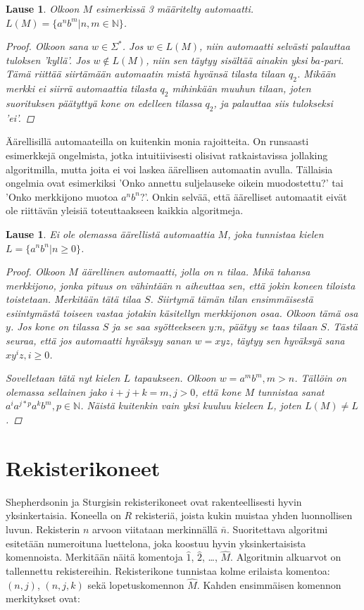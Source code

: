 \documentclass[a4paper, 12pt]{article}
\theoremstyle{definition}
\theoremstyle{plain}
\newtheorem{teor}[mydef]{Lause}
\begin{document}
\begin{teor}
Olkoon $M$ esimerkissä 3 määritelty automaatti. \\ $L(M) = \{a^nb^m | n, m \in \mathbb{N}\}$.
\begin{proof}
Olkoon sana $w \in \Sigma^*$. Jos $w \in L(M)$, niin automaatti selvästi palauttaa tuloksen 'kyllä'. Jos $w \notin L(M)$, niin sen täytyy sisältää ainakin yksi $ba$-pari. Tämä riittää siirtämään automaatin mistä hyvänsä tilasta tilaan $q_2$. Mikään merkki ei siirrä automaattia tilasta $q_2$ mihinkään muuhun tilaan, joten suorituksen päätyttyä kone on edelleen tilassa $q_2$, ja palauttaa siis tulokseksi 'ei'.
\qedhere
\end{proof}
\end{teor}


Äärellisillä automaateilla on kuitenkin monia rajoitteita. On runsaasti esimerkkejä ongelmista, jotka intuitiivisesti olisivat ratkaistavissa jollaking algoritmilla, mutta joita ei voi laskea äärellisen automaatin avulla. Tällaisia ongelmia ovat esimerkiksi 'Onko annettu suljelauseke oikein muodostettu?' tai 'Onko merkkijono muotoa $a^nb^n$?'. Onkin selvää, että äärelliset automaatit eivät ole riittävän yleisiä toteuttaakseen kaikkia algoritmeja.

\begin{teor}
Ei ole olemassa äärellistä automaattia $M$, joka tunnistaa kielen $L = \{a^nb^n | n \geq 0\}$.
\begin{proof}
Olkoon $M$ äärellinen automaatti, jolla on $n$ tilaa. Mikä tahansa merkkijono, jonka pituus on vähintään $n$ aiheuttaa sen, että jokin koneen tiloista toistetaan. Merkitään tätä tilaa $S$. Siirtymä tämän tilan ensimmäisestä esiintymästä toiseen vastaa jotakin käsitellyn merkkijonon osaa. Olkoon tämä osa $y$. Jos kone on tilassa $S$ ja se saa syötteekseen $y$:n, päätyy se taas tilaan $S$. Tästä seuraa, että jos automaatti hyväksyy sanan $w = xyz$, täytyy sen hyväksyä sana $xy^iz, i \geq 0$.

Sovelletaan tätä nyt kielen $L$ tapaukseen. Olkoon $w = a^mb^m, m > n$. Tällöin on olemassa sellainen jako $i + j + k = m, j > 0$, että kone $M$ tunnistaa sanat $a^ia^{j*p}a^kb^m, p \in \mathbb{N}$. Näistä kuitenkin vain yksi kuuluu kieleen $L$, joten $L(M) \neq L$.
\qedhere
\end{proof}
\end{teor}

\section{Rekisterikoneet}
Shepherdsonin ja Sturgisin rekisterikoneet ovat rakenteellisesti hyvin yksinkertaisia. Koneella on $R$ rekisteriä, joista kukin muistaa yhden luonnollisen luvun. Rekisterin $n$ arvoon viitataan merkinnällä $\bar{n}$. Suoritettava algoritmi esitetään numeroituna luettelona, joka koostuu hyvin yksinkertaisista komennoista. Merkitään näitä komentoja $\hat{1}$, $\hat{2}$, \dots , $\hat{M}$. Algoritmin alkuarvot on tallennettu rekistereihin. Rekisterikone tunnistaa kolme erilaista komentoa: $(n,j)$, $(n,j,k)$ sekä lopetuskomennon $\hat{M}$. Kahden ensimmäisen komennon merkitykset ovat:
\end{document}

